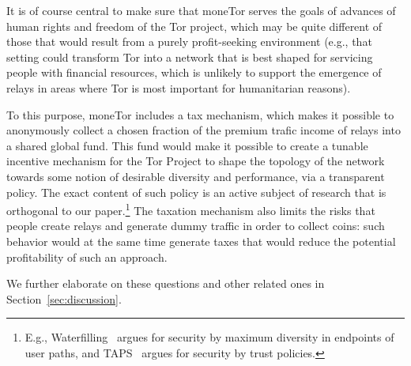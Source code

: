 It is of course central to make sure that moneTor serves the goals of
advances of human rights and freedom of the Tor project, which may be
quite different of those that would result from a purely
profit-seeking environment (e.g., that setting could transform Tor
into a network that is best shaped for servicing people with financial
resources, which is unlikely to support the emergence of relays in
areas where Tor is most important for humanitarian reasons).

To this purpose, moneTor includes a tax mechanism, which makes it
possible to anonymously collect a chosen fraction of the premium
trafic income of relays into a shared global fund. This fund would
make it possible to create a tunable incentive mechanism for the Tor
Project to shape the topology of the network towards some notion of
desirable diversity and performance, via a transparent policy. The
exact content of such policy is an active subject of research that is
orthogonal to our paper.\footnote{E.g.,
  Waterfilling~\cite{waterfilling-pets2017} argues for security by
  maximum diversity in endpoints of user paths, and
  TAPS~\cite{taps-ndss2017} argues for security by trust policies.}
The taxation mechanism also limits the risks that people create relays
and generate dummy traffic in order to collect coins: such behavior
would at the same time generate taxes that would reduce the potential
profitability of such an approach. 

We further elaborate on these questions and other related ones in
Section~\ref{sec:discussion}.




